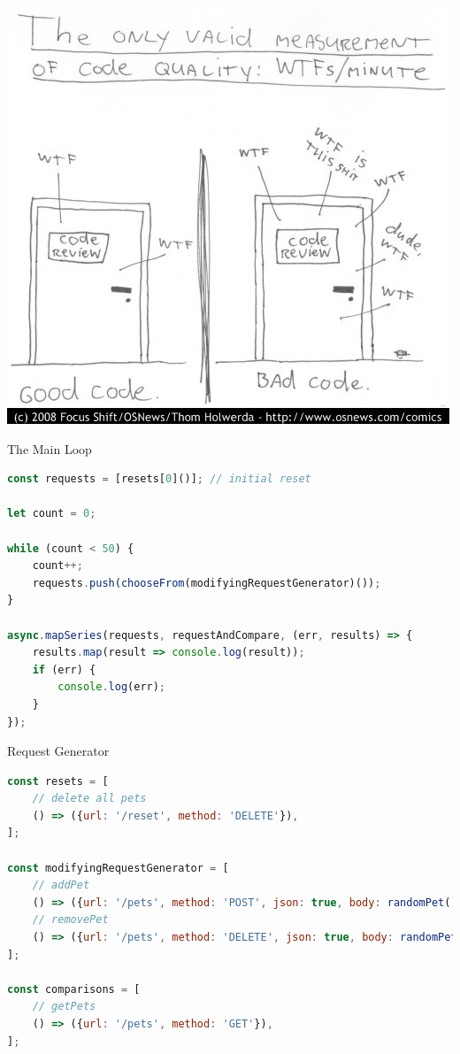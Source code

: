 \begin{frame}[fragile]{}

\begin{center}
\includegraphics[height=.9\textheight]{images/wtfperminute.jpg}
\end{center}

\end{frame}

\begin{frame}[fragile]{The Main Loop}

\begin{lstlisting}[language=JavaScript]
const requests = [resets[0]()]; // initial reset

let count = 0;

while (count < 50) {
    count++;
    requests.push(chooseFrom(modifyingRequestGenerator)());
}

async.mapSeries(requests, requestAndCompare, (err, results) => {
    results.map(result => console.log(result));
    if (err) {
        console.log(err);
    }
});
\end{lstlisting}

\end{frame}

\begin{frame}[fragile]{Request Generator}

\begin{lstlisting}[language=JavaScript]
const resets = [
    // delete all pets
    () => ({url: '/reset', method: 'DELETE'}),
];

const modifyingRequestGenerator = [
    // addPet
    () => ({url: '/pets', method: 'POST', json: true, body: randomPet()}),
    // removePet
    () => ({url: '/pets', method: 'DELETE', json: true, body: randomPet()})
];

const comparisons = [
    // getPets
    () => ({url: '/pets', method: 'GET'}),
];
\end{lstlisting}

\end{frame}


